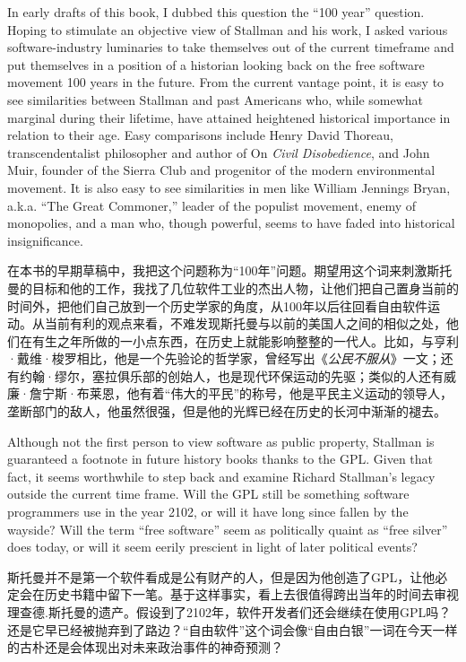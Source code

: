 \ifdefined\eng
In early drafts of this book, I dubbed this question the ``100 year'' question. Hoping to stimulate an objective view of Stallman and his work, I asked various software-industry luminaries to take themselves out of the current timeframe and put themselves in a position of a historian looking back on the free software movement 100 years in the future. From the current vantage point, it is easy to see similarities between Stallman and past Americans who, while somewhat marginal during their lifetime, have attained heightened historical importance in relation to their age. Easy comparisons include Henry David Thoreau, transcendentalist philosopher and author of On \textit{Civil Disobedience}, and John Muir, founder of the Sierra Club and progenitor of the modern environmental movement. It is also easy to see similarities in men like William Jennings Bryan, a.k.a. ``The Great Commoner,'' leader of the populist movement, enemy of monopolies, and a man who, though powerful, seems to have faded into historical insignificance.
\fi

\ifdefined\chs
在本书的早期草稿中，我把这个问题称为``100年''问题。期望用这个词来刺激斯托曼的目标和他的工作，我找了几位软件工业的杰出人物，让他们把自己置身当前的时间外，把他们自己放到一个历史学家的角度，从100年以后往回看自由软件运动。从当前有利的观点来看，不难发现斯托曼与以前的美国人之间的相似之处，他们在有生之年所做的一小点东西，在历史上就能影响整整的一代人。比如，与亨利·戴维·梭罗相比，他是一个先验论的哲学家，曾经写出《\textit{公民不服从}》一文；还有约翰·缪尔，塞拉俱乐部的创始人，也是现代环保运动的先驱；类似的人还有威廉·詹宁斯·布莱恩，他有着``伟大的平民''的称号，他是平民主义运动的领导人，垄断部门的敌人，他虽然很强，但是他的光辉已经在历史的长河中渐渐的褪去。
\fi

\ifdefined\eng
Although not the first person to view software as public property, Stallman is guaranteed a footnote in future history books thanks to the GPL. Given that fact, it seems worthwhile to step back and examine Richard Stallman's legacy outside the current time frame. Will the GPL still be something software programmers use in the year 2102, or will it have long since fallen by the wayside? Will the term ``free software'' seem as politically quaint as ``free silver'' does today, or will it seem eerily prescient in light of later political events?
\fi

\ifdefined\chs
斯托曼并不是第一个软件看成是公有财产的人，但是因为他创造了GPL，让他必定会在历史书籍中留下一笔。基于这样事实，看上去很值得跨出当年的时间去审视理查德.斯托曼的遗产。假设到了2102年，软件开发者们还会继续在使用GPL吗？还是它早已经被抛弃到了路边？``自由软件''这个词会像``自由白银''一词在今天一样的古朴还是会体现出对未来政治事件的神奇预测？
\fi

